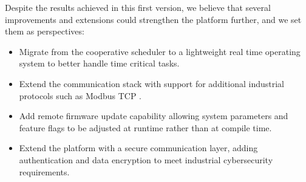 Despite the results achieved in this first version, we believe that several 
improvements and extensions could strengthen the platform further, and we 
set them as perspectives:

\begin{itemize}
    \item Migrate from the cooperative scheduler to a lightweight real time 
    operating system to better handle time critical tasks.
    \item Extend the communication stack with support for additional 
    industrial protocols such as Modbus TCP .
    \item Add remote firmware update capability allowing system parameters 
    and feature flags to be adjusted at runtime rather than at compile time.
    \item Extend the platform with a secure communication layer, adding 
    authentication and data encryption to meet industrial cybersecurity requirements.
\end{itemize}
